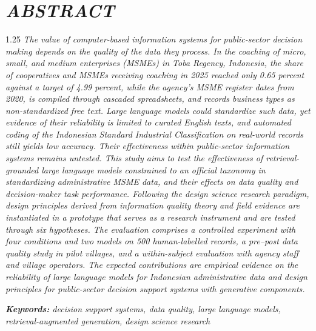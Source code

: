 \documentclass[12pt,a4paper]{report}
\begin{document}
\chapter*{\centering \textit{ABSTRACT}}

\begin{spacing}{1.25}
\noindent\textit{The value of computer-based information systems for public-sector decision making depends on the quality of the data they process. In the coaching of micro, small, and medium enterprises (MSMEs) in Toba Regency, Indonesia, the share of cooperatives and MSMEs receiving coaching in 2025 reached only 0.65 percent against a target of 4.99 percent, while the agency's MSME register dates from 2020, is compiled through cascaded spreadsheets, and records business types as non-standardized free text. Large language models could standardize such data, yet evidence of their reliability is limited to curated English texts, and automated coding of the Indonesian Standard Industrial Classification on real-world records still yields low accuracy. Their effectiveness within public-sector information systems remains untested. This study aims to test the effectiveness of retrieval-grounded large language models constrained to an official taxonomy in standardizing administrative MSME data, and their effects on data quality and decision-maker task performance. Following the design science research paradigm, design principles derived from information quality theory and field evidence are instantiated in a prototype that serves as a research instrument and are tested through six hypotheses. The evaluation comprises a controlled experiment with four conditions and two models on 500 human-labelled records, a pre--post data quality study in pilot villages, and a within-subject evaluation with agency staff and village operators. The expected contributions are empirical evidence on the reliability of large language models for Indonesian administrative data and design principles for public-sector decision support systems with generative components.}\par\medskip

\noindent\textit{\textbf{Keywords:} decision support systems, data quality, large language models, retrieval-augmented generation, design science research}
\end{spacing}
\end{document}
